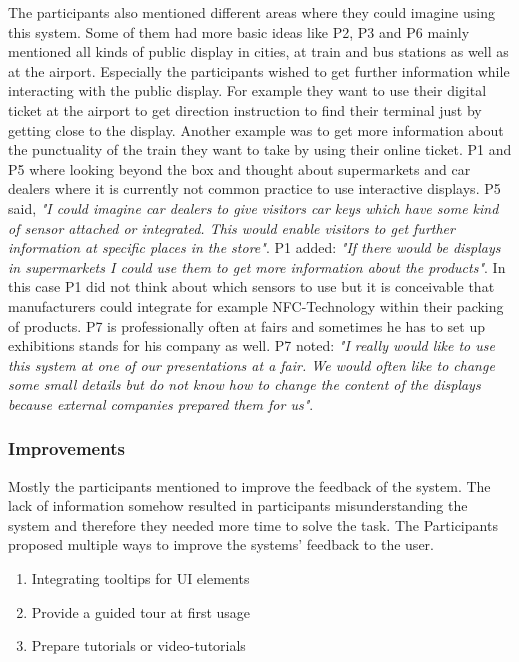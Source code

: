 The participants also mentioned different areas where they could imagine using this system. Some of them had more basic ideas like P2, P3 and P6 mainly mentioned all kinds of public display in cities, at train and bus stations as well as at the airport. Especially the participants wished to get further information while interacting with the public display. For example they want to use their digital ticket at the airport to get direction instruction to find their terminal just by getting close to the display. Another example was to get more information about the punctuality of the train they want to take by using their online ticket. P1 and P5 where looking beyond the box and thought about supermarkets and car dealers where it is currently not common practice to use interactive displays. P5 said, \textit{"I could imagine car dealers to give visitors car keys which have some kind of sensor attached or integrated. This would enable visitors to get further information at specific places in the store"}. P1 added: \textit{"If there would be displays in supermarkets I could use them to get more information about the products"}. In this case P1 did not think about which sensors to use but it is conceivable that manufacturers could integrate for example NFC-Technology within their packing of products. P7 is professionally often at fairs and sometimes he has to set up exhibitions stands for his company as well. P7 noted: \textit{"I really would like to use this system at one of our presentations at a fair. We would often like to change some small details but do not know how to change the content of the displays because external companies prepared them for us"}.

\subsubsection{Improvements}
Mostly the participants mentioned to improve the feedback of the system. The lack of information somehow resulted in participants misunderstanding the system and therefore they needed more time to solve the task. The Participants proposed multiple ways to improve the systems' feedback to the user. 

\begin{enumerate}
	\item{Integrating tooltips for UI elements}
	\item{Provide a guided tour at first usage}
	\item{Prepare tutorials or video-tutorials}
\end{enumerate}

